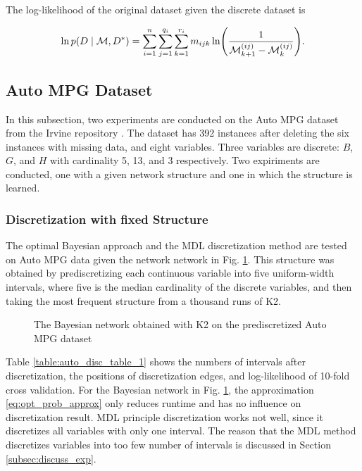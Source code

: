 The log-likelihood of the original dataset given the discrete dataset is

\begin{equation}
  \ln p(D\mid \discset, D^*) = \sum_{i=1}^n \sum_{j=1}^{q_i} \sum_{k=1}^{r_i} m_{ijk} \ln\paren{
    \frac{
      1
    }{
      \discset^{(ij)}_{k+1} - \discset^{(ij)}_{k}
    }
  }\text{.}
\end{equation}

\subsection{Auto MPG Dataset}
\label{subsec:auto}

In this subsection, two experiments are conducted on the Auto MPG dataset from the Irvine repository \citep{Lichman_2013}. The dataset has \num{392} instances after deleting the six instances with missing data, and eight variables. Three variables are discrete: $B$, $G$, and $H$ with cardinality \num{5}, \num{13}, and \num{3} respectively. Two expiriments are conducted, one with a given network structure and one in which the structure is learned.

\subsubsection{Discretization with fixed Structure}
\label{subsubsec:auto_exp1}

The optimal Bayesian approach and the MDL discretization method are tested on Auto MPG data given the network network in Fig. \ref{fig:auto_graph_1}. This structure was obtained by prediscretizing each continuous variable into five uniform-width intervals, where five is the median cardinality of the discrete variables, and then taking the most frequent structure from a thousand runs of K2. 

\begin{figure}[ht]
  \centering
    
  \caption{The Bayesian network obtained with K2 on the prediscretized Auto MPG dataset}
  \label{fig:auto_graph_1}
\end{figure}

Table \ref{table:auto_disc_table_1} shows the numbers of intervals after discretization, the positions of discretization edges, and log-likelihood of 10-fold cross validation. For the Bayesian network in Fig. \ref{fig:auto_graph_1}, the approximation \ref{eq:opt_prob_approx} only reduces runtime and has no influence on discretization result. MDL principle discretization works not well, since it discretizes all variables with only one interval. The reason that the MDL method discretizes variables into too few number of intervals is discussed in Section \ref{subsec:discuss_exp}.

